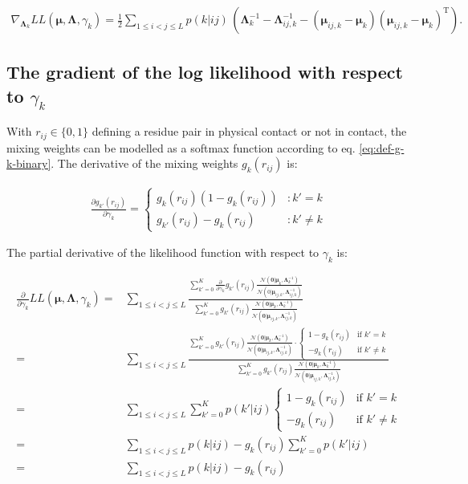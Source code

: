 \documentclass[12pt,a4paper,twoside]{book}
\newcommand{\Gauss}{\mathcal{N}}
\newcommand{\Lijk}{\mathbf{\Lambda}_{ij,k}}
\newcommand{\Lk}{\mathbf{\Lambda}_k}
\newcommand{\muijk}{\mathbf{\mu}_{ij,k}}
\newcommand{\muk}{\mathbf{\mu}_k}
\newcommand{\rij}{r_{ij}}
\theoremstyle{definition}
\theoremstyle{definition}
\theoremstyle{remark}
\begin{document}
\begin{align}
    \nabla_{\Lk}  L\!L(\mathbf{\mu}, \mathbf{\Lambda}, \gamma_k)
    =  \frac{1}{2} \sum_{1\le i<j\le L}  p(k|ij)  \, 
        \left( \Lk^{-1} - \Lijk^{-1} - (\muijk - \muk) (\muijk - \muk)^\mathrm{T} \right). 
\label{eq:gradient-lambdak-final}
\end{align}

\subsection{\texorpdfstring{The gradient of the log likelihood with
respect to
\(\gamma_k\)}{The gradient of the log likelihood with respect to \textbackslash{}gamma\_k}}\label{the-gradient-of-the-log-likelihood-with-respect-to-gamma_k}

With \(\rij \in \{0,1\}\) defining a residue pair in physical contact or
not in contact, the mixing weights can be modelled as a softmax function
according to eq. \eqref{eq:def-g-k-binary}. The derivative of the mixing
weights \(g_k(\rij)\) is:

\begin{eqnarray}
\frac{\partial g_{k'}(\rij)} {\partial \gamma_k} = \left\{
  \begin{array}{lr}
    g_k(\rij) (1 - g_k(\rij)) & : k' = k\\
    g_{k'}(\rij) - g_k(\rij)  & : k' \neq k
  \end{array}
  \right.
\end{eqnarray}

The partial derivative of the likelihood function with respect to
\(\gamma_k\) is:

\begin{align}
\frac{\partial} {\partial \gamma_k}     L\!L(\mathbf{\mu}, \mathbf{\Lambda}, \gamma_k) 
  =&  \sum_{1\le i<j\le L} \frac{\sum_{k'=0}^K  \frac{\partial}{\partial \gamma_k} g_{k'}(\rij)  
  \frac{\Gauss(\mathbf{0} | \muk, \Lk^{-1})}{\Gauss( 0 | \muijk, \Lijk^{-1})}}
  {\sum_{k'=0}^K g_{k'}(\rij)  \frac{  \Gauss(\mathbf{0} | \muk, \Lk^{-1})}{\Gauss( \mathbf{0} | \muijk, \Lijk^{-1})}} \\
  =&  \sum_{1\le i<j\le L} \frac{\sum_{k'=0}^K  g_{k'}(\rij)  
  \frac{  \Gauss(\mathbf{0} | \muk, \Lk^{-1})}{\Gauss( \mathbf{0} | \muijk, \Lijk^{-1})} \cdot 
  \begin{cases} 
   1-g_k(\rij) & \text{if } k' = k \\
   -g_k(\rij)  & \text{if } k' \neq k
  \end{cases}}
  {\sum_{k'=0}^K g_{k'}(\rij)  \frac{  \Gauss(\mathbf{0} | \muk, \Lk^{-1})}{\Gauss( \mathbf{0} | \muijk, \Lijk^{-1})}} \\
  =& \sum_{1\le i<j\le L} \sum_{k'=0}^K p(k'|ij) 
  \begin{cases} 
    1-g_k(\rij) & \text{if } k' = k \\
    -g_k(\rij)  & \text{if } k' \neq k 
  \end{cases} \\
  =& \sum_{1 \leq i<j\leq L} p(k|ij) - g_k(\rij) \sum_{k'=0}^K p(k'|ij) \nonumber\\
  =& \sum_{1 \leq i<j\leq L} p(k|ij) - g_k(\rij)
\end{align}
\end{document}
